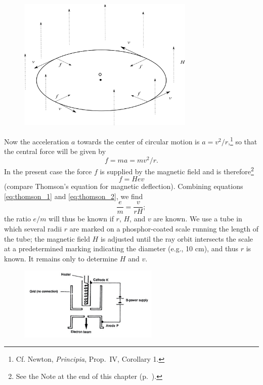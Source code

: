 \begin{figure}[h]
  \begin{center}
    \includegraphics[width=0.75\textwidth]{images/02_thomson/image099.png}
  \end{center}
\end{figure}

Now the acceleration $a$ towards the center of circular motion is
$a = v^2/r$,\footnote{Cf. Newton, \emph{Principia},
  Prop.\ IV, Corollary 1.} so that the central force will be given by
%
\begin{equation}
f = ma = mv^2/r.\label{eq:thomson_1}
\end{equation}
%
In the present case the force $f$ is supplied by the magnetic field
and is therefore\footnote{See the Note at the end of this chapter (p.~\pageref{n:thomson}).}
\begin{equation}
f = Hev\label{eq:thomson_2}
\end{equation}
(compare Thomson's equation for magnetic deflection). Combining
equations \eqref{eq:thomson_1} and \eqref{eq:thomson_2}, we find
\begin{equation}
\frac{e}{m} = \frac{v}{rH};\label{eq:thomson_3}
\end{equation}
the ratio $e/m$ will thus be known if $r$, $H$, and
$v$ are known. We use a tube in which several radii $r$
are marked on a phosphor-coated scale running the length of the tube; 
the magnetic field $H$ is adjusted
until the ray orbit intersects the scale at a predetermined marking indicating 
the diameter (e.g., 10 cm), and thus $r$ is
known. It remains only to determine $H$ and $v$.

\begin{figure}[h]
  \begin{center}
    \includegraphics[width=2.63in,height=1.36667in]{images/02_thomson/gun.png}
  \end{center}
\end{figure}


